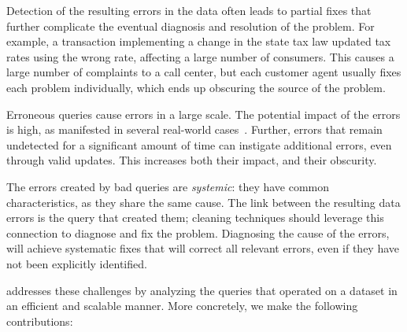 \begin{description}[leftmargin=*, topsep=0mm, itemsep=0mm]
    
    \item[Obscurity.] Detection of the resulting errors in the data often
    leads to partial fixes that further complicate the eventual diagnosis and
    resolution of the problem. For example, a transaction implementing a
    change in the state tax law updated tax rates using the wrong rate,
    affecting a large number of consumers. This causes a large number of
    complaints to a call center, but each customer agent usually fixes each
    problem individually, which ends up obscuring the source of the problem.
    
    \item[Large impact.] Erroneous queries cause errors in a large scale. The
    potential impact of the errors is high, as manifested in several
    real-world cases~\cite{Yates10, Grady13, sakalerrors}. Further, errors
    that remain undetected for a significant amount of time can instigate
    additional errors, even through valid updates. This increases both their
    impact, and their obscurity.
    
    \item[Systemic errors.] The errors created by bad queries are
    \emph{systemic}: they have common characteristics, as they share the same
    cause. The link between the resulting data errors is the query that
    created them; cleaning techniques should leverage this connection to
    diagnose and fix the problem. Diagnosing the cause of the errors, will
    achieve systematic fixes that will correct all relevant errors, even if
    they have not been explicitly identified.
    
\end{description}
% 
\sys addresses these challenges by analyzing the queries that operated on a
dataset in an efficient and scalable manner. More concretely, we make the
following contributions:



